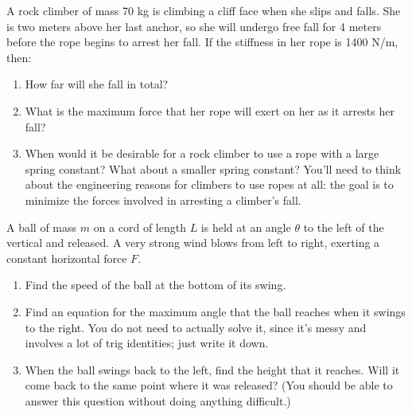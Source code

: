 \documentclass[12pt]{article}
\begin{document}
\Large
\centerline{}
\normalsize
\centerline{}


{A rock climber of mass 70 kg is climbing a cliff face when she slips and falls. She is two meters above her last anchor, so she will undergo free fall for 4 meters before the rope begins to arrest her fall. If the stiffness in her rope is 1400 N/m, then:}
  \begin{enumerate}
    \item{How far will she fall in total?}
\vspace{2in}

    \item{What is the maximum force that her rope will exert on her as it arrests her fall?}
\vspace{1.5in}

    \item When would it be desirable for a rock climber to use a rope with a large spring constant? What about a smaller spring constant? You'll need to think about 
          the engineering reasons for climbers to use ropes at all: the goal is to minimize the forces involved in arresting a climber's fall.
   \end{enumerate}

\newpage
%
%
%
%
 
 {A ball of mass $m$ on a cord of length $L$ is held at an angle $\theta$ to the left of the vertical and released. A very strong wind blows from left to right, exerting a constant horizontal force $F$. }

     \begin{enumerate}
       \item{Find the speed of the ball at the bottom of its swing.}
\vspace{2in}

       \item{Find an equation for the maximum angle that the ball reaches when it swings to the right. You do not need to actually solve it, since it's messy and involves a lot of trig identities; just write it down.}

\vspace{2in}

       \item{When the ball swings back to the left, find the height that it reaches. Will it come
         back to the same point where it was released? (You should be able to answer this question without doing anything difficult.)}
     \end{enumerate}
\end{document}
